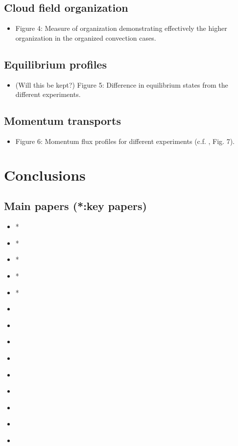 \documentclass[11pt,a4paper]{article}
\begin{document}
\subsection{Cloud field organization}
\begin{itemize}
    \item Figure 4: Measure of organization demonstrating effectively the higher organization in the organized convection cases.
\end{itemize}

\subsection{Equilibrium profiles}
\begin{itemize}
    \item (Will this be kept?) Figure 5: Difference in equilibrium states from the different experiments. 
\end{itemize}

\subsection{Momentum transports}
\begin{itemize}
    \item Figure 6: Momentum flux profiles for different experiments (c.f. \cite{RE2001}, Fig. 7).
\end{itemize}
\section{Conclusions}

\newpage
\subsection*{Main papers (*:key papers)}
\begin{itemize}
    \item * \cite{CC2006I}
    \item * \cite{CC2006II}
    \item * \cite{RE2001}
    \item * \cite{RKW1988}
    \item * \cite{PC2008}
    \item \cite{birch2014scale}
    \item \cite{cohen2004response}
    \item \cite{gregory1997parametrization}
    \item \cite{houze1977structure}
    \item \cite{kershaw1997parametrization}
    \item \cite{robe1996moist}
    \item \cite{sakradzija2016stochastic}
    \item \cite{sengupta1990cumulus}
    \item \cite{TMM1982}
\end{itemize}


\printbibliography[title={References}]
\end{document}
